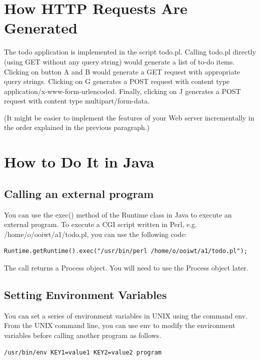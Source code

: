 \documentclass[a4paper,11pt]{exam}
\begin{document}
\section*{How HTTP Requests Are Generated}

The todo application is implemented in the script todo.pl. Calling todo.pl directly (using GET without any query string) would generate a list of to-do items. Clicking on button A and B would generate a GET request with appropriate query strings. Clicking on G generates a POST request with content type application/x-www-form-urlencoded. Finally, clicking on J generates a POST request with content type multipart/form-data.

(It might be easier to implement the features of your Web server incrementally in the order explained in the previous paragraph.)

\section*{How to Do It in Java}

\subsection*{Calling an external program}

You can use the exec() method of the Runtime class in Java to execute an external program. To execute a CGI script written in Perl, e.g. /home/o/ooiwt/a1/todo.pl, you can use the following code:

\begin{verbatim}
Runtime.getRuntime().exec("/usr/bin/perl /home/o/ooiwt/a1/todo.pl");
\end{verbatim}

The call returns a Process object. You will need to use the Process object later.

\subsection*{Setting Environment Variables}

You can set a series of environment variables in UNIX using the command env. From the UNIX command line, you can use env to modify the environment variables before calling another program as follows.

\begin{verbatim}
/usr/bin/env KEY1=value1 KEY2=value2 program
\end{verbatim}
\end{document}
